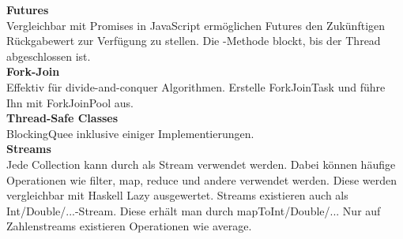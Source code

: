 \textbf{Futures}\\
Vergleichbar mit Promises in JavaScript ermöglichen Futures den Zukünftigen Rückgabewert zur Verfügung zu stellen.
Die -Methode blockt, bis der Thread abgeschlossen ist.\\

\textbf{Fork-Join}\\
Effektiv für divide-and-conquer Algorithmen. Erstelle ForkJoinTask und führe Ihn mit ForkJoinPool aus.\\

\textbf{Thread-Safe Classes}\\
BlockingQuee inklusive einiger Implementierungen.\\

\textbf{Streams}\\
Jede Collection kann durch  als Stream verwendet werden.
Dabei können häufige Operationen wie filter, map, reduce und andere verwendet werden.
Diese werden vergleichbar mit Haskell Lazy ausgewertet.
Streams existieren auch als Int/Double/...-Stream. Diese erhält man durch mapToInt/Double/...
Nur auf Zahlenstreams existieren Operationen wie average.

